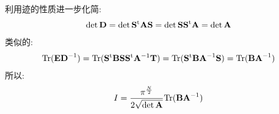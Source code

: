         利用迹的性质进一步化简:
        \begin{equation}
            \begin{aligned}
                \det{\mathbf{D}} = \det{\mathbf{S}^{\mathrm{t}}\mathbf{A}\mathbf{S}} = \det{\mathbf{SS}^{\mathrm{t}}\mathbf{A}} = \det{\mathbf{A}}
            \end{aligned}
        \end{equation}
        类似的: 
        \begin{equation}
            \begin{aligned}
                \mathrm{Tr}(\mathbf{ED}^{-1}) = \mathrm{Tr}(\mathbf{S}^\mathrm{t}\mathbf{BS}\mathbf{S}^\mathrm{t} \mathbf{A}^{-1}\mathbf{T})
                = \mathrm{Tr}(\mathbf{S}^\mathrm{t}\mathbf{BA}^{-1}\mathbf{S})
                = \mathrm{Tr}(\mathbf{BA}^{-1})
            \end{aligned}
        \end{equation}
        所以:
        \begin{equation}
            \begin{aligned}
                I = \frac {\pi^{\frac N2}}{2\sqrt{\det{\mathbf{A}}}} \mathrm{Tr} (\mathbf{BA}^{-1})
            \end{aligned}
        \end{equation}

